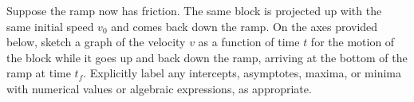 \documentclass{../../../oss-classkick-exam}
\begin{document}
\begin{questions}
\begin{parts}
  \item Suppose the ramp now has friction. The same block is projected up with
    the same initial speed $v_0$ and comes back down the ramp. On the axes
    provided below, sketch a graph of the velocity $v$ as a function of time $t$
    for the motion of the block while it goes up and back down the ramp,
    arriving at the bottom of the ramp at time $t_f$. Explicitly label any
    intercepts, asymptotes, maxima, or minima with numerical values or
    algebraic expressions, as appropriate.
    \begin{center}
    \end{center}
  \end{parts}
  
\end{questions}
\end{document}
